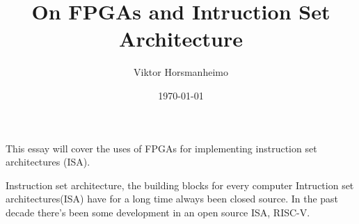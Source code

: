 \documentclass{paper}
\title{On FPGAs and Intruction Set Architecture}
\author{Viktor Horsmanheimo}
\date{\today}
\begin{document}
\maketitle

This essay will cover the uses of FPGAs for implementing instruction set architectures
(ISA).

Instruction set architecture, the building blocks for every computer
Intruction set architectures(ISA) have for a long time always been closed
source. In the past decade there's been some development in an open source ISA, RISC-V.



\printbibliography
\end{document}
